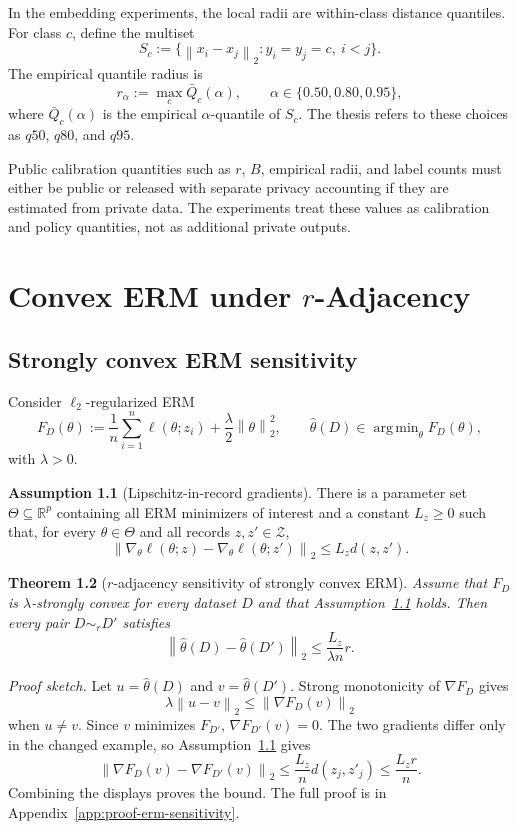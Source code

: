 \documentclass[11pt,a4paper]{report}
\theoremstyle{plain}
\newtheorem{theorem}{Theorem}[chapter]
\theoremstyle{definition}
\newtheorem{assumption}[theorem]{Assumption}
\theoremstyle{remark}
\DeclareMathOperator*{\argmin}{arg\,min}
\newcommand{\R}{\mathbb{R}}
\newcommand{\cZ}{\mathcal{Z}}
\newcommand{\norm}[1]{\left\lVert #1\right\rVert}
\begin{document}
In the embedding experiments, the local radii are within-class distance quantiles.  For class $c$, define the multiset
\[
S_c:=\{\norm{x_i-x_j}_2: y_i=y_j=c,\ i<j\}.
\]
The empirical quantile radius is
\[
r_\alpha:=\max_c \bar Q_c(\alpha),
\qquad
\alpha\in\{0.50,0.80,0.95\},
\]
where $\bar Q_c(\alpha)$ is the empirical $\alpha$-quantile of $S_c$.  The thesis refers to these choices as $q50$, $q80$, and $q95$.

Public calibration quantities such as $r$, $B$, empirical radii, and label counts must either be public or released with separate privacy accounting if they are estimated from private data.  The experiments treat these values as calibration and policy quantities, not as additional private outputs.

\chapter{Convex ERM under $r$-Adjacency}
\label{ch:convex-erm}

\section{Strongly convex ERM sensitivity}
\label{sec:convex-erm-sensitivity}

Consider $\ell_2$-regularized ERM
\[
F_D(\theta)
:=
\frac{1}{n}\sum_{i=1}^n\ell(\theta;z_i)
+
\frac{\lambda}{2}\norm{\theta}_2^2,
\qquad
\hat\theta(D)\in\argmin_\theta F_D(\theta),
\]
with $\lambda>0$.

\begin{assumption}[Lipschitz-in-record gradients]
\label{ass:lz}
There is a parameter set $\Theta\subseteq\R^p$ containing all ERM minimizers of interest and a constant $L_z\ge0$ such that, for every $\theta\in\Theta$ and all records $z,z'\in\cZ$,
\[
\norm{\nabla_\theta\ell(\theta;z)-\nabla_\theta\ell(\theta;z')}_2
\le
L_z d(z,z').
\]
\end{assumption}

\begin{theorem}[$r$-adjacency sensitivity of strongly convex ERM]
\label{thm:erm-sensitivity}
Assume that $F_D$ is $\lambda$-strongly convex for every dataset $D$ and that Assumption~\ref{ass:lz} holds.  Then every pair $D\sim_r D'$ satisfies
\[
\norm{\hat\theta(D)-\hat\theta(D')}_2
\le
\frac{L_z}{\lambda n}r.
\]
\end{theorem}

\noindent\emph{Proof sketch.}
Let $u=\hat\theta(D)$ and $v=\hat\theta(D')$.  Strong monotonicity of $\nabla F_D$ gives
\[
\lambda\norm{u-v}_2\le \norm{\nabla F_D(v)}_2
\]
when $u\ne v$.  Since $v$ minimizes $F_{D'}$, $\nabla F_{D'}(v)=0$.  The two gradients differ only in the changed example, so Assumption~\ref{ass:lz} gives
\[
\norm{\nabla F_D(v)-\nabla F_{D'}(v)}_2
\le \frac{L_z}{n}d(z_j,z'_j)
\le \frac{L_z r}{n}.
\]
Combining the displays proves the bound.  The full proof is in Appendix~\ref{app:proof-erm-sensitivity}.
\end{document}
